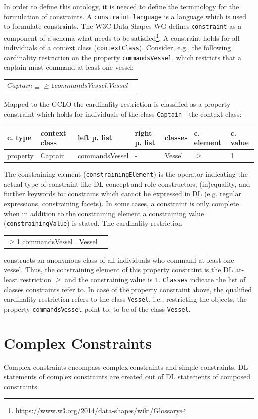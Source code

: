 \documentclass{llncs}
\newcommand{\ms}[1]{\texttt{#1}}
\newenvironment{gcotable}{
  \scriptsize
  \sffamily
  \vspace{0.3cm}
	\begin{center}
  \begin{tabular}{l|l|l|l|l|l|l}
  \hline
  \textbf{c. type} & \textbf{context class} & \textbf{left p. list} & \textbf{right p. list} & \textbf{classes} & \textbf{c. element} & \textbf{c. value} \\
  \hline

}{
  \hline
  \end{tabular}
	\end{center}
}
\newenvironment{DL}{
	\begin{center}
  \begin{tabular}{r l}

}{
  \end{tabular}
	\end{center}
}
\begin{document}
In order to define this ontology, it is needed to define the terminology for the formulation of constraints. 
A \ms{constraint language} is a language which is used to formulate constraints.
The W3C Data Shapes WG defines \ms{constraint} as a component of a schema what needs to be satisfied\footnote{\url{https://www.w3.org/2014/data-shapes/wiki/Glossary}}.
A constraint holds for all individuals of a context class (\ms{contextClass}).
Consider, e.g., the following cardinality restriction on the property \ms{commandsVessel}, which restricts that a captain must command at least one vessel: 
\begin{DL}
$Captain \sqsubseteq \geq1 commandsVessel . Vessel $
\end{DL}
Mapped to the GCLO the cardinality restriction is classified as a property constraint which holds for individuals of the class \ms{Captain} - the context class:
\begin{gcotable}
property & Captain & commandsVessel & - & Vessel & $\geq$ & 1 \\
\end{gcotable}
The constraining element (\ms{constrainingElement}) is the operator indicating the actual type of constraint like DL concept and role constructors, (in)equality, and further keywords for constrains which cannot be expressed in DL (e.g. regular expressions, constraining facets).
In some cases, a constraint is only complete when in addition to the constraining element a constraining value (\ms{constrainingValue}) is stated.
The cardinality restriction 
\begin{DL}
$\geq$1 commandsVessel . Vessel
\end{DL}
constructs an anonymous class of all individuals who command at least one vessel.
Thus, the constraining element of this property constraint is the DL at-least restriction \ms{$\geq$} and the constraining value is \ms{1}.
\ms{Classes} indicate the list of classes constraints refer to.
In case of the property constraint above, the qualified cardinality restriction refers to the class \ms{Vessel}, 
i.e., restricting the objects, the property \ms{commandsVessel} point to, to be of the class \ms{Vessel}.

\section{Complex Constraints}

Complex constraints encompass complex constraints and simple constraints.
DL statements of complex constraints are created out of DL statements of composed constraints. 
\end{document}
